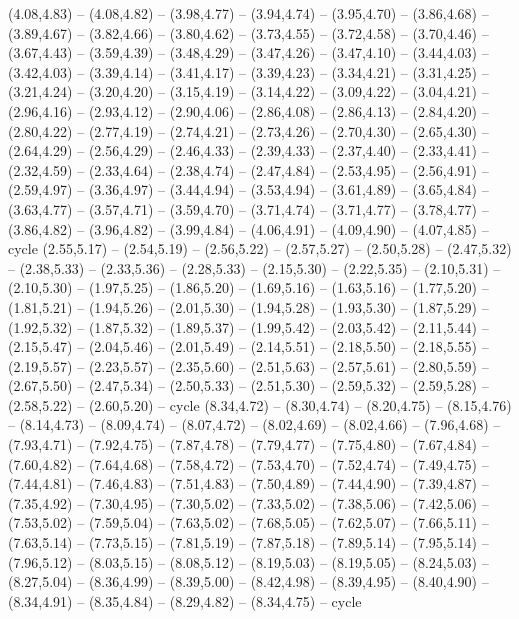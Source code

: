 \expandafter\def\csname geo:gebiet:USA\endcsname{
  (4.08,4.83) -- (4.08,4.82) -- (3.98,4.77) -- (3.94,4.74) -- (3.95,4.70) -- (3.86,4.68) -- (3.89,4.67) -- (3.82,4.66) -- (3.80,4.62) -- (3.73,4.55) -- (3.72,4.58) -- (3.70,4.46) -- (3.67,4.43) -- (3.59,4.39) -- (3.48,4.29) -- (3.47,4.26) -- (3.47,4.10) -- (3.44,4.03) -- (3.42,4.03) -- (3.39,4.14) -- (3.41,4.17) -- (3.39,4.23) -- (3.34,4.21) -- (3.31,4.25) -- (3.21,4.24) -- (3.20,4.20) -- (3.15,4.19) -- (3.14,4.22) -- (3.09,4.22) -- (3.04,4.21) -- (2.96,4.16) -- (2.93,4.12) -- (2.90,4.06) -- (2.86,4.08) -- (2.86,4.13) -- (2.84,4.20) -- (2.80,4.22) -- (2.77,4.19) -- (2.74,4.21) -- (2.73,4.26) -- (2.70,4.30) -- (2.65,4.30) -- (2.64,4.29) -- (2.56,4.29) -- (2.46,4.33) -- (2.39,4.33) -- (2.37,4.40) -- (2.33,4.41) -- (2.32,4.59) -- (2.33,4.64) -- (2.38,4.74) -- (2.47,4.84) -- (2.53,4.95) -- (2.56,4.91) -- (2.59,4.97) -- (3.36,4.97) -- (3.44,4.94) -- (3.53,4.94) -- (3.61,4.89) -- (3.65,4.84) -- (3.63,4.77) -- (3.57,4.71) -- (3.59,4.70) -- (3.71,4.74) -- (3.71,4.77) -- (3.78,4.77) -- (3.86,4.82) -- (3.96,4.82) -- (3.99,4.84) -- (4.06,4.91) -- (4.09,4.90) -- (4.07,4.85) -- cycle
  (2.55,5.17) -- (2.54,5.19) -- (2.56,5.22) -- (2.57,5.27) -- (2.50,5.28) -- (2.47,5.32) -- (2.38,5.33) -- (2.33,5.36) -- (2.28,5.33) -- (2.15,5.30) -- (2.22,5.35) -- (2.10,5.31) -- (2.10,5.30) -- (1.97,5.25) -- (1.86,5.20) -- (1.69,5.16) -- (1.63,5.16) -- (1.77,5.20) -- (1.81,5.21) -- (1.94,5.26) -- (2.01,5.30) -- (1.94,5.28) -- (1.93,5.30) -- (1.87,5.29) -- (1.92,5.32) -- (1.87,5.32) -- (1.89,5.37) -- (1.99,5.42) -- (2.03,5.42) -- (2.11,5.44) -- (2.15,5.47) -- (2.04,5.46) -- (2.01,5.49) -- (2.14,5.51) -- (2.18,5.50) -- (2.18,5.55) -- (2.19,5.57) -- (2.23,5.57) -- (2.35,5.60) -- (2.51,5.63) -- (2.57,5.61) -- (2.80,5.59) -- (2.67,5.50) -- (2.47,5.34) -- (2.50,5.33) -- (2.51,5.30) -- (2.59,5.32) -- (2.59,5.28) -- (2.58,5.22) -- (2.60,5.20) -- cycle}
\expandafter\def\csname geo:gebiet:KAZ\endcsname{
  (8.34,4.72) -- (8.30,4.74) -- (8.20,4.75) -- (8.15,4.76) -- (8.14,4.73) -- (8.09,4.74) -- (8.07,4.72) -- (8.02,4.69) -- (8.02,4.66) -- (7.96,4.68) -- (7.93,4.71) -- (7.92,4.75) -- (7.87,4.78) -- (7.79,4.77) -- (7.75,4.80) -- (7.67,4.84) -- (7.60,4.82) -- (7.64,4.68) -- (7.58,4.72) -- (7.53,4.70) -- (7.52,4.74) -- (7.49,4.75) -- (7.44,4.81) -- (7.46,4.83) -- (7.51,4.83) -- (7.50,4.89) -- (7.44,4.90) -- (7.39,4.87) -- (7.35,4.92) -- (7.30,4.95) -- (7.30,5.02) -- (7.33,5.02) -- (7.38,5.06) -- (7.42,5.06) -- (7.53,5.02) -- (7.59,5.04) -- (7.63,5.02) -- (7.68,5.05) -- (7.62,5.07) -- (7.66,5.11) -- (7.63,5.14) -- (7.73,5.15) -- (7.81,5.19) -- (7.87,5.18) -- (7.89,5.14) -- (7.95,5.14) -- (7.96,5.12) -- (8.03,5.15) -- (8.08,5.12) -- (8.19,5.03) -- (8.19,5.05) -- (8.24,5.03) -- (8.27,5.04) -- (8.36,4.99) -- (8.39,5.00) -- (8.42,4.98) -- (8.39,4.95) -- (8.40,4.90) -- (8.34,4.91) -- (8.35,4.84) -- (8.29,4.82) -- (8.34,4.75) -- cycle}
